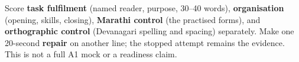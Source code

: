 \begin{tcolorbox}[breakable,colback=teal!4,colframe=teal!35!black,title={Before you move on}]
Score \textbf{task fulfilment} (named reader, purpose, 30–40 words), \textbf{organisation} (opening, skills, closing), \textbf{Marathi control} (the practised forms), and \textbf{orthographic control} (Devanagari spelling and spacing) separately. Make one 20-second \textbf{repair} on another line; the stopped attempt remains the evidence. This is not a full A1 mock or a readiness claim.
\end{tcolorbox}
